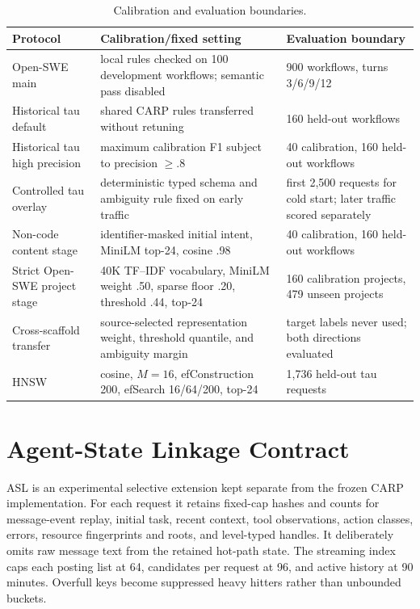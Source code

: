 \documentclass[letterpaper]{article} %
\newcommand{\carp}{\textsc{CARP}\xspace}
\newcommand{\asl}{\textsc{ASL}\xspace}
\begin{document}
\begin{table}[t]
\centering
\small
\begin{tabular}{@{}p{}p{}p{}@{}}
\toprule
Protocol & Calibration/fixed setting & Evaluation boundary \\
\midrule
Open-SWE main & local rules checked on 100 development workflows; semantic pass disabled & 900 workflows, turns 3/6/9/12 \\
Historical tau default & shared CARP rules transferred without retuning & 160 held-out workflows \\
Historical tau high precision & maximum calibration F1 subject to precision $\geq .8$ & 40 calibration, 160 held-out workflows \\
Controlled tau overlay & deterministic typed schema and ambiguity rule fixed on early traffic & first 2,500 requests for cold start; later traffic scored separately \\
Non-code content stage & identifier-masked initial intent, MiniLM top-24, cosine .98 & 40 calibration, 160 held-out workflows \\
Strict Open-SWE project stage & 40K TF--IDF vocabulary, MiniLM weight .50, sparse floor .20, threshold .44, top-24 & 160 calibration projects, 479 unseen projects \\
Cross-scaffold transfer & source-selected representation weight, threshold quantile, and ambiguity margin & target labels never used; both directions evaluated \\
HNSW & cosine, $M=16$, efConstruction 200, efSearch 16/64/200, top-24 & 1,736 held-out tau requests \\
\bottomrule
\end{tabular}
\caption{Calibration and evaluation boundaries.}
\end{table}

\section{Agent-State Linkage Contract}

\asl is an experimental selective extension kept separate from the frozen \carp implementation.
For each request it retains fixed-cap hashes and counts for message-event replay, initial task,
recent context, tool observations, action classes, errors, resource fingerprints and roots, and
level-typed handles. It deliberately omits raw message text from the retained hot-path state. The
streaming index caps each posting list at 64, candidates per request at 96, and active history at 90
minutes. Overfull keys become suppressed heavy hitters rather than unbounded buckets.
\end{document}
